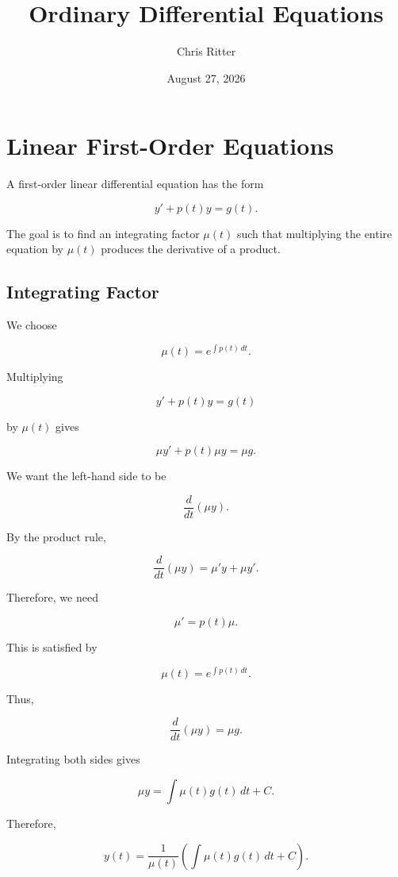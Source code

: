 \documentclass[11pt]{article}
\title{Ordinary Differential Equations}
\author{Chris Ritter}
\date{August 27, 2026}
\begin{document}
\maketitle
\tableofcontents
\newpage

\section{Linear First-Order Equations}

A first-order linear differential equation has the form

\[
y' + p(t)y = g(t).
\]

The goal is to find an integrating factor $\mu(t)$ such that
multiplying the entire equation by $\mu(t)$ produces the derivative
of a product.

\subsection{Integrating Factor}

We choose

\[
\mu(t)
=
e^{\int p(t)\,dt}.
\]

Multiplying

\[
y' + p(t)y = g(t)
\]

by $\mu(t)$ gives

\[
\mu y' + p(t)\mu y = \mu g.
\]

We want the left-hand side to be

\[
\frac{d}{dt}(\mu y).
\]

By the product rule,

\[
\frac{d}{dt}(\mu y)
=
\mu' y + \mu y'.
\]

Therefore, we need

\[
\mu' = p(t)\mu.
\]

This is satisfied by

\[
\mu(t)=e^{\int p(t)\,dt}.
\]

Thus,

\[
\frac{d}{dt}(\mu y)=\mu g.
\]

Integrating both sides gives

\[
\mu y
=
\int \mu(t)g(t)\,dt+C.
\]

Therefore,

\[
\boxed{
y(t)
=
\frac{1}{\mu(t)}
\left(
\int \mu(t)g(t)\,dt+C
\right)
}.
\]
\end{document}
